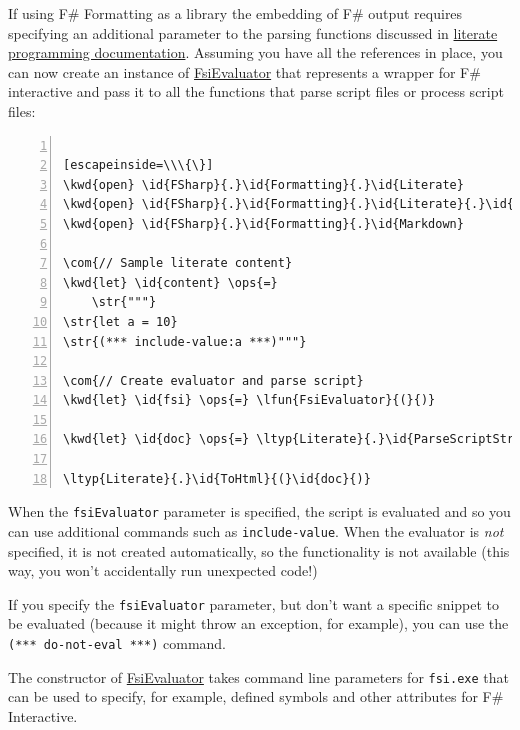 \documentclass{article}
\newcommand{\id}[1]{\textcolor{black}{#1}}
\newcommand{\com}[1]{\textcolor{officegreen}{#1}}
\newcommand{\kwd}[1]{\textcolor{navy}{#1}}
\newcommand{\ops}[1]{\textcolor{purple}{#1}}
\newcommand{\str}[1]{\textcolor{olive}{#1}}
\begin{document}
If using F\# Formatting as a library the embedding of F\# output requires specifying an additional parameter to the
parsing functions discussed in \href{literate.html}{literate programming documentation}.
Assuming you have all the references in place, you can now create an instance of
\href{https://fsprojects.github.io/FSharp.Formatting/reference/fsharp-formatting-literate-evaluation-fsievaluator.html}{FsiEvaluator} that represents a wrapper for F\# interactive and pass it to all the
functions that parse script files or process script files:
\begin{lstlisting}[numbers=left]

[escapeinside=\\\{\}]
\kwd{open} \id{FSharp}{.}\id{Formatting}{.}\id{Literate}
\kwd{open} \id{FSharp}{.}\id{Formatting}{.}\id{Literate}{.}\id{Evaluation}
\kwd{open} \id{FSharp}{.}\id{Formatting}{.}\id{Markdown}

\com{// Sample literate content}
\kwd{let} \id{content} \ops{=}
    \str{"""}
\str{let a = 10}
\str{(*** include-value:a ***)"""}

\com{// Create evaluator and parse script}
\kwd{let} \id{fsi} \ops{=} \lfun{FsiEvaluator}{(}{)}

\kwd{let} \id{doc} \ops{=} \ltyp{Literate}{.}\id{ParseScriptString}{(}\id{content}{,} \lfun{fsiEvaluator} \ops{=} \id{fsi}{)}

\ltyp{Literate}{.}\id{ToHtml}{(}\id{doc}{)}

\end{lstlisting}



When the \texttt{fsiEvaluator} parameter is specified, the script is evaluated and so you
can use additional commands such as \texttt{include-value}. When the evaluator is \emph{not} specified,
it is not created automatically, so the functionality is not available (this way,
you won't accidentally run unexpected code!)


If you specify the \texttt{fsiEvaluator} parameter, but don't want a specific snippet to be evaluated
(because it might throw an exception, for example), you can use the \texttt{(*** do-not-eval ***)}
command.


The constructor of \href{https://fsprojects.github.io/FSharp.Formatting/reference/fsharp-formatting-literate-evaluation-fsievaluator.html}{FsiEvaluator} takes command line parameters for \texttt{fsi.exe} that can
be used to specify, for example, defined symbols and other attributes for F\# Interactive.
\end{document}
